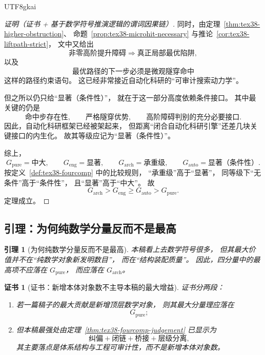 \documentclass[12pt]{article}
\newtheorem{lemma}{引理}[section]
\newtheorem{Certificate}{证书}[section]
\begin{document}
\begin{CJK*}{UTF8}{gkai}
\begin{proof}[证明（证书 + 基于数学符号推演逻辑的谓词因果链）]
同时，由定理~\ref{thm:tex38-higher-obstruction}、
命题~\ref{prop:tex38-microhit-necessary} 与推论~\ref{cor:tex38-liftpath-strict}，
文中又给出
\[
  \text{非零高阶提升障碍}
  \Rightarrow
  \text{真正局部最优陷阱},
\]
以及
\[
  \text{最优路径的下一步必须是微观隧穿命中}
\]
这样的路径约束语句。
这已经非常接近自动化科研的“可审计搜索动力学”。

但之所以仍只给“显著（条件性）”，
就在于这一部分高度依赖条件接口。
其中最关键的仍是
\[
  \text{命中步存在性},\qquad
  \text{严格隧穿优势},\qquad
  \text{高阶障碍判别的充分必要接口}.
\]
因此，自动化科研框架已经被架起来，
但距离“闭合自动化科研引擎”还差几块关键接口的内生化。
故其等级应记为“显著（条件性）”。

综上，
\[
  G_{\mathrm{pure}}=\text{中大},
  \qquad
  G_{\mathrm{eng}}=\text{显著},
  \qquad
  G_{\mathrm{arch}}=\text{承重级},
  \qquad
  G_{\mathrm{auto}}=\text{显著（条件性）}.
\]
按定义~\ref{def:tex38-fourcomp} 中的比较规则，
“承重级”高于“显著”，
同等级下“无条件”高于“条件性”，
且“显著”高于“中大”。
故
\[
  G_{\mathrm{arch}}
  >
  G_{\mathrm{eng}}
  \ge
  G_{\mathrm{auto}}
  >
  G_{\mathrm{pure}}.
\]
定理成立。
\end{proof}

\subsection{引理：为何纯数学分量反而不是最高}
\label{subsec:tex38-fourcomp-lemma}

\begin{lemma}[为何纯数学分量反而不是最高]
\label{lem:tex38-fourcomp-pure}
本稿看上去数学符号很多，
但其最大价值并不在“纯数学对象新发明数目”，
而在“结构装配质量”。
因此，四分量中的最高项不应落在 $G_{\mathrm{pure}}$，
而应落在 $G_{\mathrm{arch}}$。
\end{lemma}

\begin{Certificate}[证书：新增本体对象数不主导本稿的最大增益]
\label{cert:tex38-fourcomp-pure}
证书分两段：
\begin{enumerate}
  \item 若一篇稿子的最大贡献是新增顶层数学对象，
  则其最大分量理应落在
  \[
    G_{\mathrm{pure}};
  \]
  \item 但本稿最强处由定理~\ref{thm:tex38-fourcomp-judgement} 已显示为
  \[
    \text{纠偏}
    +
    \text{闭链}
    +
    \text{桥接}
    +
    \text{层级分离},
  \]
  其主要落点是体系结构与工程可审计性，而不是新增本体对象数。
\end{enumerate}
\end{Certificate}


\end{CJK*}
\end{document}
